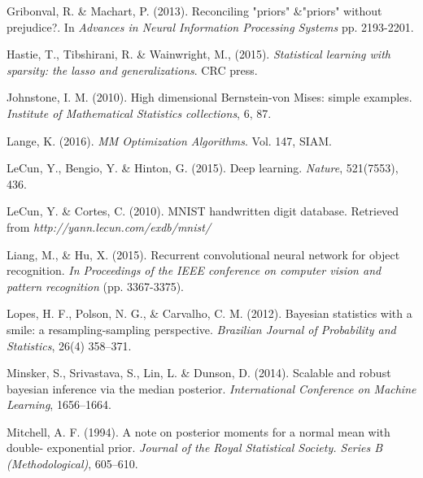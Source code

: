 \documentclass[12pt]{TD-CJS}
\begin{document}
\begin{thebibliography}{}
Gribonval, R. \& Machart, P. (2013). 
Reconciling "priors" \&"priors" without prejudice?. In {\em Advances in Neural Information Processing Systems} 
pp. 2193-2201.


Hastie, T., Tibshirani, R. \& Wainwright, M., (2015). {\em Statistical learning with sparsity: the lasso and generalizations}. CRC press.


Johnstone, I. M. (2010). High dimensional Bernstein-von Mises: simple examples. {\it Institute of Mathematical Statistics collections}, 6, 87.

Lange, K. (2016). {\em MM Optimization Algorithms}. Vol. 147, SIAM. 

LeCun, Y., Bengio, Y. \& Hinton, G. (2015). Deep learning. {\it Nature}, 521(7553), 436.

LeCun, Y. \& Cortes, C. (2010). MNIST handwritten digit database. Retrieved from {\it http://yann.lecun.com/exdb/mnist/}

Liang, M., \& Hu, X. (2015). Recurrent convolutional neural network for object recognition. {\it In Proceedings of the IEEE conference on computer vision and pattern recognition} (pp. 3367-3375).

Lopes, H. F., Polson, N. G., \&  Carvalho, C. M. (2012). Bayesian statistics with a smile: a resampling-sampling perspective. {\it Brazilian Journal of Probability and Statistics}, 26(4) 358--371.

Minsker, S., Srivastava, S.,  Lin, L. \& Dunson, D. (2014). Scalable and robust bayesian inference via the median posterior. {\it International Conference on Machine Learning}, 1656--1664.

Mitchell, A. F. (1994). A note on posterior moments for a normal mean with double- exponential prior. {\it Journal of the Royal Statistical Society. Series B (Methodological)}, 605--610.


\end{thebibliography}
\end{document}
